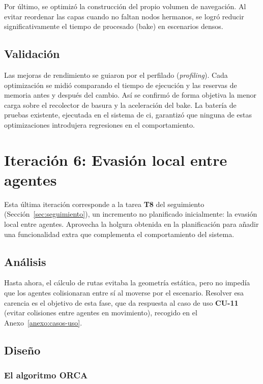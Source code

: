 Por último, se optimizó la construcción del propio volumen de navegación.
Al evitar reordenar las capas cuando no faltan nodos hermanos, se logró reducir significativamente el tiempo de procesado (\gls{bake}) en escenarios densos.

\subsection{Validación}

Las mejoras de rendimiento se guiaron por el perfilado (\textit{profiling}).
Cada optimización se midió comparando el tiempo de ejecución y las reservas de memoria antes y después del cambio.
Así se confirmó de forma objetiva la menor carga sobre el recolector de basura y la aceleración del \gls{bake}.
La batería de pruebas existente, ejecutada en el sistema de \acrshort{ci}, garantizó que ninguna de estas optimizaciones introdujera regresiones en el comportamiento.

\section{Iteración 6: Evasión local entre agentes}
\label{sec:iter-evasion}

Esta última iteración corresponde a la tarea \textbf{T8} del seguimiento (Sección~\ref{sec:seguimiento}), un incremento no planificado inicialmente: la evasión local entre agentes.
Aprovecha la holgura obtenida en la planificación para añadir una funcionalidad extra que complementa el comportamiento del sistema.

\subsection{Análisis}

Hasta ahora, el cálculo de rutas evitaba la geometría estática, pero no impedía que los agentes colisionaran entre sí al moverse por el escenario.
Resolver esa carencia es el objetivo de esta fase, que da respuesta al caso de uso \textbf{CU-11} (evitar colisiones entre agentes en movimiento), recogido en el Anexo~\ref{anexo:casos-uso}.

\subsection{Diseño}

\subsubsection{El algoritmo ORCA}

